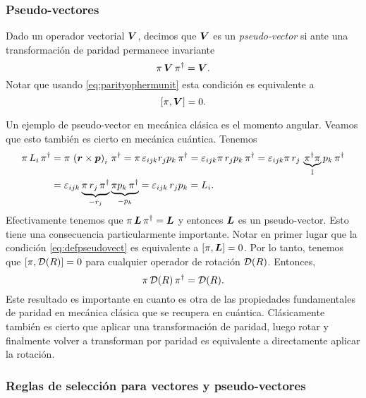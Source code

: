 \documentclass[10pt, a4paper]{article}
\numberwithin{equation}{subsection}
\begin{document}
\subsubsection{Pseudo-vectores}
Dado un operador vectorial $\vb*{V}$, decimos que $\vb*{V}$ es un
\emph{pseudo-vector} si ante una transformación de paridad permanece invariante
\begin{equation} \label{eq:defpseudovect}
  \pi\,\vb*{V}\,\pi^\dagger = \vb*{V}.
\end{equation}
Notar que usando \eqref{eq:parityophermunit} esta condición es equivalente a
\begin{equation} \label{eq:defpseudovectcomm}
  \comm{\parityop}{\vect{V}} = 0.
\end{equation}

Un ejemplo de pseudo-vector en mecánica clásica es el momento angular. Veamos
que esto también es cierto en mecánica cuántica. Tenemos
\begin{align}
  \pi\,L_i\,\pi^\dagger
  &= \pi\,\left(\vb*{r}\times\vb*{p}\right)_i\,\pi^\dagger
    = \pi\,\varepsilon_{ijk}r_jp_k\,\pi^\dagger
    = \varepsilon_{ijk} \pi\,r_jp_k\,\pi^\dagger
    = \varepsilon_{ijk} \pi\,r_j\, \underbrace{\pi^\dagger
      \pi}_{\mathbb{I}} p_k\,\pi^\dagger \nonumber \\
  &= \varepsilon_{ijk} \underbrace{\pi\,r_j\, \pi^\dagger}_{-r_j}
     \underbrace{\pi p_k\,\pi^\dagger}_{-p_k}
    = \varepsilon_{ijk} \,r_jp_k = L_i.
\end{align}
Efectivamente tenemos que $\pi\,\vb*{L}\,\pi^\dagger = \vb*{L}$ y
entonces $\vb*{L}$ es un pseudo-vector. Esto tiene una consecuencia
particularmente importante. Notar en primer lugar que la condición
\eqref{eq:defpseudovect} es equivalente a $\comm{\parityop}{\vect{L}} = 0$. Por
lo tanto, tenemos que $\comm{\parityop}{\RotationOp(R)} = 0$ para cualquier
operador de rotación $\RotationOp(R)$. Entonces,
\begin{equation}
  \parityop\,\RotationOp(R)\,\parityop^\dagger = \RotationOp(R).
\end{equation}
Este resultado es importante en cuanto es otra de las propiedades fundamentales
de paridad en mecánica clásica que se recupera en cuántica. Clásicamente
también es cierto que aplicar una transformación de paridad, luego rotar y
finalmente volver a transforman por paridad es equivalente a directamente
aplicar la rotación.

\subsubsection{Reglas de selección para vectores y pseudo-vectores}
\end{document}
